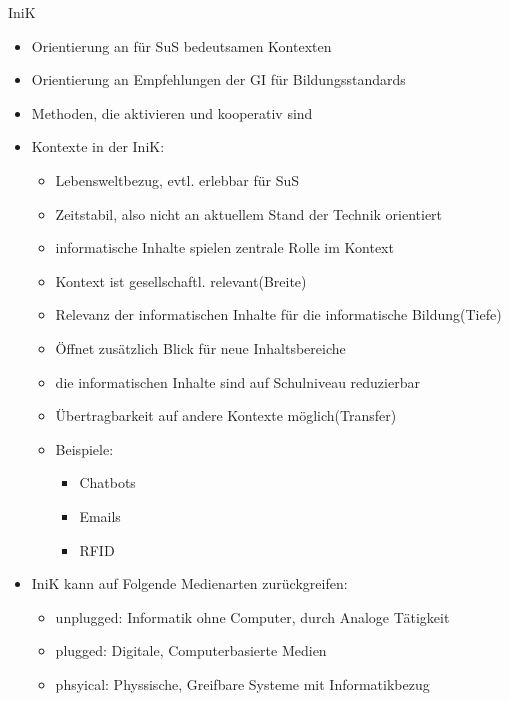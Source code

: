 \documentclass{article}
\begin{document}
\begin{block}{IniK}
    \begin{itemize}
        \item Orientierung an für SuS bedeutsamen Kontexten
        \item Orientierung an Empfehlungen der GI für Bildungsstandards
        \item Methoden, die aktivieren und kooperativ sind
        \item Kontexte in der IniK:
        \begin{itemize}
            \item Lebensweltbezug, evtl. erlebbar für SuS
            \item Zeitstabil, also nicht an aktuellem Stand der Technik orientiert
            \item informatische Inhalte spielen zentrale Rolle im Kontext
            \item Kontext ist gesellschaftl. relevant(Breite)
            \item Relevanz der informatischen Inhalte für die informatische Bildung(Tiefe)
            \item Öffnet zusätzlich Blick für neue Inhaltsbereiche
            \item die informatischen Inhalte sind auf Schulniveau reduzierbar
            \item Übertragbarkeit auf andere Kontexte möglich(Transfer)
            \item Beispiele:
            \begin{itemize}
                \item Chatbots
                \item Emails
                \item RFID
            \end{itemize}
        \end{itemize}
        \item IniK kann auf Folgende Medienarten zurückgreifen:
        \begin{itemize}
            \item unplugged: Informatik ohne Computer, durch Analoge Tätigkeit
            \item plugged: Digitale, Computerbasierte Medien
            \item phsyical: Physsische, Greifbare Systeme mit Informatikbezug
        \end{itemize}
    \end{itemize}
\end{block}
\end{document}
